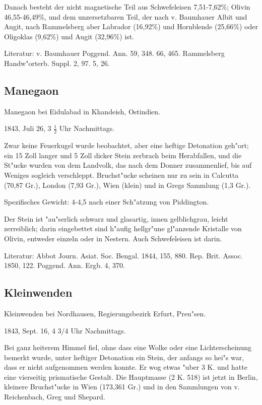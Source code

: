 \documentclass[a4paper, 11pt, oneside]{article}
\begin{document}
Danach besteht der nicht magnetische Teil aus Schwefeleisen 7,51-7,62\%; Olivin 46,55-46,49\%, und dem unzersetzbaren Teil, der nach v. Baumhauer Albit und Augit, nach Rammelsberg aber Labrador (16,92\%) und Hornblende (25,66\%) oder Oligoklas (9,62\%) und Augit (32,96\%) ist.

Literatur: v. Baumhauer Poggend. Ann. 59, 348. 66, 465. Rammelsberg Handw"orterb. Suppl. 2, 97. 5, 26.

\subsection{Manegaon}

Manegaon bei Eidulabad in Khandeish, Ostindien.

1843, Juli 26, 3 $\frac{1}{2}$ Uhr Nachmittags.

Zwar keine Feuerkugel wurde beobachtet, aber eine heftige Detonation geh"ort; ein 15 Zoll langer und 5 Zoll dicker Stein zerbrach beim Herabfallen, und die St"ucke wurden von dem Landvolk, das nach dem Donner zusammenlief, bis auf Weniges sogleich verschleppt. Bruchst"ucke scheinen nur zu sein in Calcutta (70,87 Gr.), London (7,93 Gr.), Wien (klein) und in Gregs Sammlung (1,3 Gr.).

Spezifisches Gewicht: 4-4,5 nach einer Sch"atzung von Piddington.

Der Stein ist "au"serlich schwarz und glasartig, innen gelblichgrau, leicht zerreiblich; darin eingebettet sind h"aufig hellgr"une gl"anzende Kristalle von Olivin, entweder einzeln oder in Nestern. Auch Schwefeleisen ist darin.

Literatur: Abbot Journ. Asiat. Soc. Bengal. 1844, 155, 880. Rep. Brit. Assoc. 1850, 122. Poggend. Ann. Ergb. 4, 370.

\subsection{Kleinwenden}

Kleinwenden bei Nordhausen, Regierungsbezirk Erfurt, Preu"sen.

1843, Sept. 16, 4 3/4 Uhr Nachmittags.

Bei ganz heiterem Himmel fiel, ohne dass eine Wolke oder eine Lichterscheinung bemerkt wurde, unter heftiger Detonation ein Stein, der anfangs so hei"s war, dass er nicht aufgenommen werden konnte. Er wog etwas "uber 3 K. und hatte eine vierseitig prismatische Gestalt. Die Hauptmasse (2 K. 518) ist jetzt in Berlin, kleinere Bruchst"ucke in Wien (173,361 Gr.) und in den Sammlungen von v. Reichenbach, Greg und Shepard.
\end{document}
